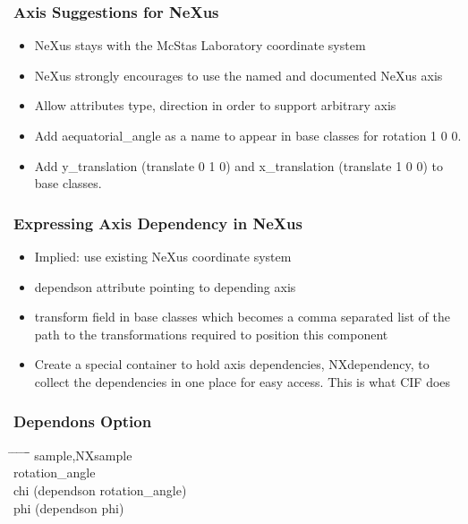 \documentclass{beamer}
\begin{document}
\begin{frame} \frametitle{Axis Suggestions for NeXus}
\begin{itemize}
\item NeXus stays with the McStas Laboratory coordinate system 
\item NeXus strongly encourages to use the named and documented NeXus 
  axis
\item Allow attributes type, direction in order to support arbitrary axis 
\item Add aequatorial\_angle as a name to appear in base classes for 
 rotation 1 0 0. 
\item Add y\_translation (translate 0 1 0) 
 and x\_translation (translate 1 0 0) to base classes.   
\end{itemize}
\end{frame}

\begin{frame} \frametitle{Expressing Axis Dependency in NeXus}
\begin{itemize}
\item Implied: use existing NeXus coordinate system
\item dependson attribute pointing to depending axis
\item transform field in base classes which becomes a comma separated list of 
 the path to the transformations required to position this component
\item Create a special container to hold axis dependencies, NXdependency, to 
 collect the dependencies in one place for easy access. This is what CIF does
\end{itemize}
\end{frame}

\begin{frame} \frametitle{Dependons Option}
\begin{tabbing}
\hspace*{1cm} \= \hspace*{1cm} \= \hspace*{1cm} \= \hspace*{1cm} \= \hspace*{1cm} \= \hspace*{1cm}\= \kill
\>sample,NXsample\\
\> \>rotation\_angle\\
\> \>chi (dependson rotation\_angle)\\
\> \>phi (dependson phi)\\
\end{tabbing}
\end{frame}
\end{document}
